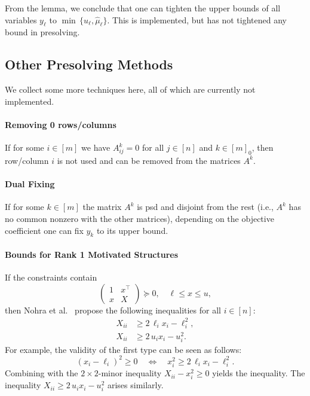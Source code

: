 \documentclass[10pt, a4paper]{article}
\newcommand{\T}{^{\top}}
\begin{document}
From the lemma, we conclude that one can tighten the upper bounds of all
variables $y_{\ell}$ to $\min\, \{u_{\ell}, \hat{\mu}_{\ell}\}$. This is
implemented, but has not tightened any bound in presolving.



\subsection{Other Presolving Methods}

We collect some more techniques here, all of which are currently not implemented.

\paragraph{Removing 0 rows/columns}

If for some $i \in [m]$ we have $A_{ij}^k = 0$ for all $j \in [n]$ and
$k \in [m]_0$, then row/column $i$ is not used and can be removed from the
matrices $A^k$.

\paragraph{Dual Fixing}

If for some $k \in [m]$ the matrix $A^k$ is psd and disjoint from the rest
(i.e., $A^k$ has no common nonzero with the other matrices), depending on
the objective coefficient one can fix $y_k$ to its upper bound.

\paragraph{Bounds for Rank 1 Motivated Structures}

If the constraints contain
\[
  \begin{pmatrix}
    1 & x\T \\
    x & X
  \end{pmatrix}
  \succeq 0,
  \quad
  \ell \leq x \leq u,
\]
then Nohra et al.~\cite{NohRS20} propose the following inequalities for all
$i \in [n]$:
\begin{align*}
  X_{ii} & \geq 2\, \ell_i x_i - \ell_i^2,\\ 
  X_{ii} & \geq 2\, u_i x_i - u_i^2.
\end{align*}
For example, the validity of the first type can be seen as follows:
\[
  (x_i - \ell_i)^2 \geq 0 \quad\Leftrightarrow\quad x_i^2 \geq 2\,
  \ell_i x_i - \ell_i^2.
\]
Combining with the $2 \times 2$-minor inequality $X_{ii} - x_i^2 \geq 0$
yields the inequality. The inequality $X_{ii} \geq 2\, u_i x_i - u_i^2$
arises similarly.
\end{document}

